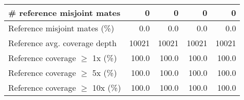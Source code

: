 \documentclass[12pt,a4paper]{article}
\begin{document}
\begin{table}[ht]
\begin{center}
\begin{tabular}{|l*{4}{|r}|}
\# reference misjoint mates & 0 & 0 & 0 & 0 \\ \hline
Reference misjoint mates (\%) & 0.0 & 0.0 & 0.0 & 0.0 \\ \hline
Reference avg. coverage depth & 10021 & 10021 & 10021 & 10021 \\ \hline
Reference coverage $\geq$ 1x (\%) & 100.0 & 100.0 & 100.0 & 100.0 \\ \hline
Reference coverage $\geq$ 5x (\%) & 100.0 & 100.0 & 100.0 & 100.0 \\ \hline
Reference coverage $\geq$ 10x (\%) & 100.0 & 100.0 & 100.0 & 100.0 \\ \hline
\end{tabular}
\end{center}
\end{table}
\end{document}
